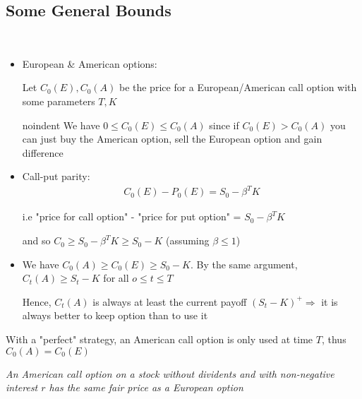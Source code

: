 \subsection{Some General Bounds}\hfill\\
\begin{itemize}
  \item European \& American options:\par
    Let $C_0(E), C_0(A)$ be the price for a European/American call option with some parameters $T,K$\par
    noindent We have $0\leq C_0(E)\leq C_0(A)$ since if $C_0(E)>C_0(A)$ you can just buy the American option, sell the European option and gain difference
    \par\bigskip
  \item Call-put parity:
    \begin{equation*}
      \begin{gathered}
        C_0(E)-P_0(E) = S_0-\beta^TK
      \end{gathered}
    \end{equation*}\par
    \noindent i.e "price for call option" - "price for put option" = $S_0-\beta^TK$\par
    \noindent and so $C_0\geq S_0-\beta^TK\geq S_0-K$ (assuming $\beta\leq1$)
    \par\bigskip
  \item We have $C_0(A)\geq C_0(E)\geq S_0-K$. By the same argument, $C_t(A)\geq S_t-K$ for all $o\leq t\leq T$\par
    \noindent Hence, $C_t(A)$ is always at least the current payoff $(S_t-K)^+\Rightarrow$ it is always better to keep option than to use it
\end{itemize}
\par\bigskip
\noindent With a "perfect" strategy, an American call option is only used at time $T$, thus $C_0(A) = C_0(E)$
\par\bigskip
\noindent\textit{An American call option on a stock without dividents and with non-negative interest $r$ has the same fair price as a European option}
\par\bigskip
